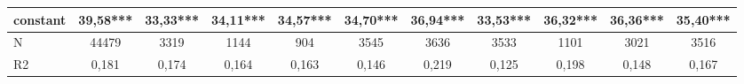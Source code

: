 {\begin{tabular}{l*{10}{c}}
constant    &       39,58***&       33,33***&       34,11***&       34,57***&       34,70***&       36,94***&       33,53***&       36,32***&       36,36***&       35,40***\\
\hline
N           &       44479   &        3319   &        1144   &         904   &        3545   &        3636   &        3533   &        1101   &        3021   &        3516   \\
R2          &       0,181   &       0,174   &       0,164   &       0,163   &       0,146   &       0,219   &       0,125   &       0,198   &       0,148   &       0,167   \\
\hline\hline
\end{tabular}
}

